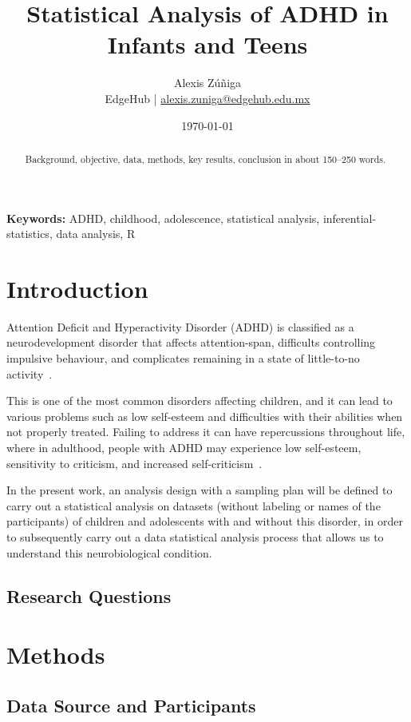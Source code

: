 \documentclass[11pt, a4paper]{article}
\title{\textbf{Statistical Analysis of ADHD in Infants and Teens}}
\author{Alexis Zúñiga\\[2pt]\small EdgeHub | \small \href{mailto:alexis.zuniga@edgehub.edu.mx}{alexis.zuniga@edgehub.edu.mx}}
\date{\today}
\begin{document}
\maketitle
\thispagestyle{empty}

\begin{abstract}
\noindent Background, objective, data, methods, key results, conclusion
in about 150--250 words.
\end{abstract}

\noindent\textbf{Keywords:} ADHD, childhood, adolescence, statistical analysis, inferential-statistics, data analysis, R

\section{Introduction}
Attention Deficit and Hyperactivity Disorder (ADHD) is classified as a neurodevelopment disorder that affects attention-span, difficults controlling impulsive behaviour, and complicates remaining in a state of little-to-no activity~\cite{nlm_adhd}.

This is one of the most common disorders affecting children, and it can lead to various problems such as low self-esteem and difficulties with their abilities when not properly treated. Failing to address it can have repercussions throughout life, where in adulthood, people with ADHD may experience low self-esteem, sensitivity to criticism, and increased self-criticism~\cite{apa_adhd}.

In the present work, an analysis design with a sampling plan will be defined to carry out a statistical analysis on datasets (without labeling or names of the participants) of children and adolescents with and without this disorder, in order to subsequently carry out a data statistical analysis process that allows us to understand this neurobiological condition.

\subsection{Research Questions}

\section{Methods}
\subsection{Data Source and Participants}
\end{document}
